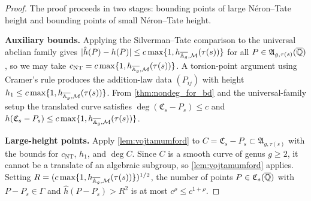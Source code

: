 \begin{proof}
  The proof proceeds in two stages: bounding points of large Néron--Tate height
  and bounding points of small Néron--Tate height.

  \textbf{Auxiliary bounds.}
  Applying the Silverman--Tate comparison to the universal abelian family gives
  \(|{\hat{h}}(P) - h(P)| \le c\max\{1, h_{\overline{\mathbb{A}_g},\mathcal{M}}(\tau(s))\}\)
  for all \(P \in \mathfrak{A}_{g,\tau(s)}(\overline{\mathbb{Q}})\), so we may take
  \(c_{\mathrm{NT}} = c\max\{1, h_{\overline{\mathbb{A}_g},\mathcal{M}}(\tau(s))\}\).
  A torsion-point argument using Cramer's rule produces the addition-law data
  \((P_{ij})\) with height \(h_1 \le c\max\{1, h_{\overline{\mathbb{A}_g},\mathcal{M}}(\tau(s))\}\).
  From \cref{thm:nondeg_for_bd} and the universal-family setup the translated
  curve satisfies \(\deg(\mathfrak{C}_s - P_s) \le c\) and
  \(h(\mathfrak{C}_s - P_s) \le c\max\{1, h_{\overline{\mathbb{A}_g},\mathcal{M}}(\tau(s))\}\).

  \textbf{Large-height points.}
  Apply \cref{lem:vojtamumford} to \(C = \mathfrak{C}_s - P_s \subset
  \mathfrak{A}_{g,\tau(s)}\) with the bounds for \(c_{\mathrm{NT}}\), \(h_1\),
  and \(\deg C\). Since \(C\) is a smooth curve of genus \(g \ge 2\), it cannot
  be a translate of an algebraic subgroup, so \cref{lem:vojtamumford} applies.
  Setting \(R = (c\max\{1, h_{\overline{\mathbb{A}_g},\mathcal{M}}(\tau(s))\})^{1/2}\),
  the number of points \(P \in \mathfrak{C}_s(\overline{\mathbb{Q}})\) with \(P - P_s \in \Gamma\)
  and \(\hat{h}(P - P_s) > R^2\) is at most \(c^\rho \le c^{1+\rho}\).


\end{proof}
